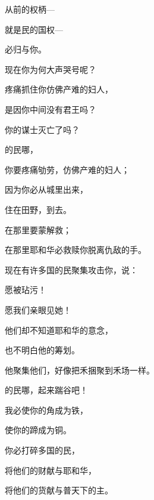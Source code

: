 {\par }{\Q 从前的权柄—
\par }{\Q 就是{}民的国权—
\par }{\Q 必归与你。
\par }{\Q {}现在你为何大声哭号呢？
\par }{\Q 疼痛抓住你仿佛产难的妇人，
\par }{\Q 是因你中间没有君王吗？
\par }{\Q 你的谋士灭亡了吗？
\par }{\Q {}的民哪，
\par }{\Q 你要疼痛劬劳，仿佛产难的妇人；
\par }{\Q 因为你必从城里出来，
\par }{\Q 住在田野，到{}去。
\par }{\Q 在那里要蒙解救；
\par }{\Q 在那里耶和华必救赎你脱离仇敌的手。
\par }{\Q {}现在有许多国的民聚集攻击你，说：
\par }{\Q 愿{}被玷污！
\par }{\Q 愿我们亲眼见她{}！
\par }{\Q {}他们却不知道耶和华的意念，
\par }{\Q 也不明白他的筹划。
\par }{\Q 他聚集他们，好像把禾捆聚到禾场一样。
\par }{\BB \par }{\Q {}的民哪，起来踹谷吧！
\par }{\Q 我必使你的角成为铁，
\par }{\Q 使你的蹄成为铜。
\par }{\Q 你必打碎多国的民，
\par }{\Q 将他们的财献与耶和华，
\par }{\Q 将他们的货献与普天下的主。

}
